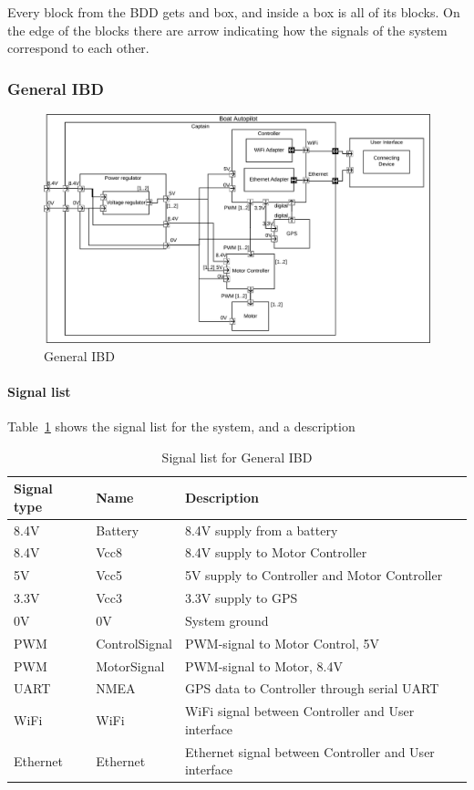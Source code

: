 Every block from the BDD gets and box, and inside a box is all of its blocks. On the edge of the blocks there are arrow indicating how the signals of the system correspond to each other.

\subsubsection{General IBD}
\label{sec:general_ibd}
\begin{figure}[H]
	\centering
	\includegraphics[width=1\linewidth]{Images/System_architecture/General_IBD}
	\caption{General IBD}
	\label{fig:general_ibd}
\end{figure}

\paragraph{Signal list}


Table~\ref{table:general_ibd} shows the signal list for the system, and a description
\begin{table}[htbp]
	\centering
	\begin{tabular}{|l|l|l|}
		\hline
		\textbf{Signal type} 	&\textbf{Name}		&\textbf{Description} \\\hline
		8.4V			&Battery	&8.4V supply from a battery\\\hline
		
		8.4V			&Vcc8		&8.4V supply to Motor Controller\\\hline
		5V			&Vcc5		&5V supply to Controller and Motor Controller\\\hline
		3.3V			&Vcc3		&3.3V supply to GPS\\\hline
		0V			&0V			&System ground\\\hline
		PWM	&ControlSignal	&PWM-signal to Motor Control, 5V\\\hline
		PWM	&MotorSignal	&PWM-signal to Motor, 8.4V\\\hline
		UART		&NMEA		&GPS data to Controller through serial UART\\\hline	
		WiFi		&WiFi		&WiFi signal between Controller and User interface\\\hline
		Ethernet	&Ethernet	&Ethernet signal between Controller and User interface\\\hline
		
		
	\end{tabular}
	\caption{Signal list for General IBD}
	\label{table:general_ibd}
\end{table}

